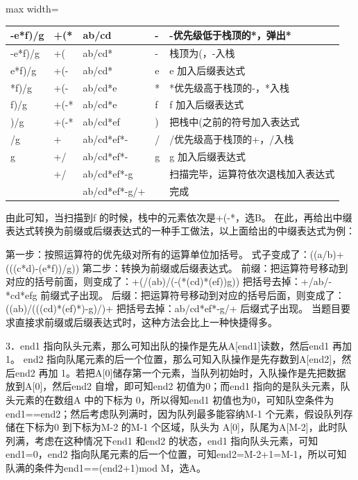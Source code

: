 \documentclass[UTF8,11pt]{ctexart}
\begin{document}
\begin{center}\begin{adjustbox}{max width=\linewidth}\begin{tabular}{|>{\raggedright\arraybackslash}p{\dimexpr(\linewidth-10\tabcolsep-6\arrayrulewidth)/5\relax}|>{\raggedright\arraybackslash}p{\dimexpr(\linewidth-10\tabcolsep-6\arrayrulewidth)/5\relax}|>{\raggedright\arraybackslash}p{\dimexpr(\linewidth-10\tabcolsep-6\arrayrulewidth)/5\relax}|>{\raggedright\arraybackslash}p{\dimexpr(\linewidth-10\tabcolsep-6\arrayrulewidth)/5\relax}|>{\raggedright\arraybackslash}p{\dimexpr(\linewidth-10\tabcolsep-6\arrayrulewidth)/5\relax}|}\hline
-e*f)/g & +(* & ab/cd & - & -优先级低于栈顶的*，弹出*\\\hline
-e*f)/g & +( & ab/cd* & - & 栈顶为(，-入栈\\\hline
e*f)/g & +(- & ab/cd* & e & e 加入后缀表达式\\\hline
*f)/g & +(- & ab/cd*e & * & *优先级高于栈顶的-，*入栈\\\hline
f)/g & +(-* & ab/cd*e & f & f 加入后缀表达式\\\hline
)/g & +(-* & ab/cd*ef & ) & 把栈中(之前的符号加入表达式\\\hline
/g & + & ab/cd*ef*- & / & /优先级高于栈顶的+，/入栈\\\hline
g & +/ & ab/cd*ef*- & g & g 加入后缀表达式\\\hline
 & +/ & ab/cd*ef*-g &  & 扫描完毕，运算符依次退栈加入表达式\\\hline
 &  & ab/cd*ef*-g/+ &  & 完成\\\hline\end{tabular}\end{adjustbox}\end{center}

由此可知，当扫描到f 的时候，栈中的元素依次是+(-*，选B。 在此，再给出中缀表达式转换为前缀或后缀表达式的一种手工做法，以上面给出的中缀表达式为例：


第一步：按照运算符的优先级对所有的运算单位加括号。 式子变成了：((a/b)+(((c*d)-(e*f))/g)) 第二步：转换为前缀或后缀表达式。 前缀：把运算符号移动到对应的括号前面，则变成了：+(/(ab)/(-(*(cd)*(ef))g)) 把括号去掉：+/ab/-*cd*efg 前缀式子出现。 后缀：把运算符号移动到对应的括号后面，则变成了：((ab)/(((cd)*(ef)*)-g)/)+ 把括号去掉：ab/cd*ef*-g/+ 后缀式子出现。 当题目要求直接求前缀或后缀表达式时，这种方法会比上一种快捷得多。


3．end1 指向队头元素，那么可知出队的操作是先从A[end1]读数，然后end1 再加1。 end2 指向队尾元素的后一个位置，那么可知入队操作是先存数到A[end2]，然后end2 再加 1。若把A[0]储存第一个元素，当队列初始时，入队操作是先把数据放到A[0]，然后end2 自增，即可知end2 初值为0；而end1 指向的是队头元素，队头元素的在数组A 中的下标为 0，所以得知end1 初值也为0，可知队空条件为end1==end2；然后考虑队列满时，因为队列最多能容纳M-1 个元素，假设队列存储在下标为0 到下标为M-2 的M-1 个区域，队头为 A[0]，队尾为A[M-2]，此时队列满，考虑在这种情况下end1 和end2 的状态，end1 指向队头元素，可知end1=0，end2 指向队尾元素的后一个位置，可知end2=M-2+1=M-1，所以可知队满的条件为end1==(end2+1)mod M，选A。
\end{document}
